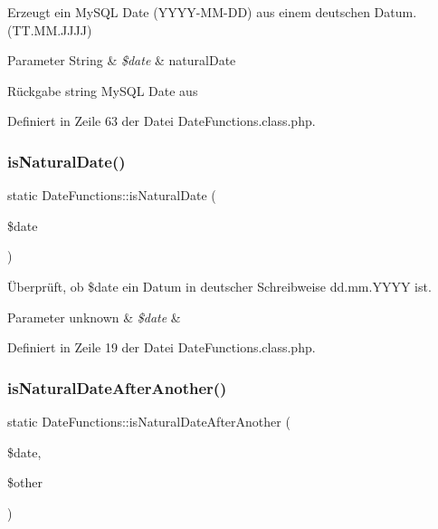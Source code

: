 Erzeugt ein My\+S\+QL Date (Y\+Y\+Y\+Y-\/\+M\+M-\/\+DD) aus einem deutschen Datum. (T\+T.\+M\+M.\+J\+J\+JJ) 
\begin{DoxyParams}[1]{Parameter}
String & {\em \$date} & natural\+Date \\
\hline
\end{DoxyParams}
\begin{DoxyReturn}{Rückgabe}
string My\+S\+QL Date aus  
\end{DoxyReturn}


Definiert in Zeile 63 der Datei Date\+Functions.\+class.\+php.

\mbox{\label{class_date_functions_afc5d5564d68170a71949997fe3458da5}} 
\subsubsection{\texorpdfstring{is\+Natural\+Date()}{isNaturalDate()}}
{\footnotesize\ttfamily static Date\+Functions\+::is\+Natural\+Date (\begin{DoxyParamCaption}\item[{}]{\$date }\end{DoxyParamCaption})\hspace{0.3cm}{\ttfamily [static]}}

Überprüft, ob \$date ein Datum in deutscher Schreibweise dd.\+mm.\+Y\+Y\+YY ist. 
\begin{DoxyParams}[1]{Parameter}
unknown & {\em \$date} & \\
\hline
\end{DoxyParams}


Definiert in Zeile 19 der Datei Date\+Functions.\+class.\+php.

\mbox{\label{class_date_functions_a16e39ab1e86381379e3d99b7493bb8f1}} 
\subsubsection{\texorpdfstring{is\+Natural\+Date\+After\+Another()}{isNaturalDateAfterAnother()}}
{\footnotesize\ttfamily static Date\+Functions\+::is\+Natural\+Date\+After\+Another (\begin{DoxyParamCaption}\item[{}]{\$date,  }\item[{}]{\$other }\end{DoxyParamCaption})\hspace{0.3cm}{\ttfamily [static]}}


